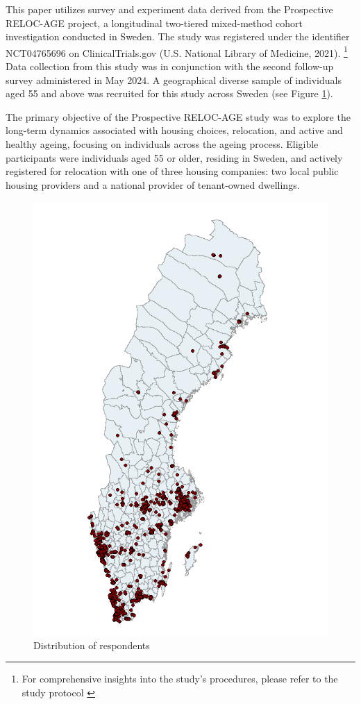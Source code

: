 \documentclass[3p,11pt ]{elsarticle}
\begin{document}
This paper utilizes survey and experiment data derived from the Prospective RELOC-AGE project,
a longitudinal two-tiered mixed-method cohort investigation conducted in Sweden.
The study was registered under the identifier NCT04765696 on ClinicalTrials.gov (U.S. National Library of Medicine, 2021).
\footnote{For comprehensive insights into the study's procedures,
please refer to the study protocol  \cite{zingmarkExploringAssociationsHousing2021}}
Data collection from this study was in conjunction with the second follow-up survey administered in May 2024.
A geographical diverse sample of individuals aged 55 and above was recruited for this study across Sweden (see Figure \ref{fig:map}).

The primary objective of the Prospective RELOC-AGE study was to explore the long-term dynamics associated with housing choices, relocation, and active and healthy ageing, focusing on individuals across the ageing process.
Eligible participants were individuals aged 55 or older, residing in Sweden, and actively registered for relocation with one of three housing companies: two local public housing providers and a national provider of tenant-owned dwellings.

\begin{figure}
\centering
\includegraphics[scale=0.5]{figures/survey_location.png}
\caption{Distribution of respondents \label{fig:map}}
\end{figure}
\end{document}
